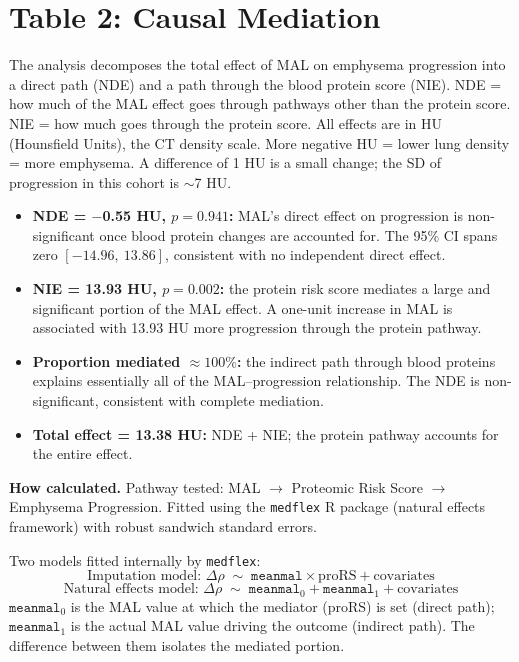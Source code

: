 \documentclass[11pt, letterpaper]{article}
\begin{document}
\section*{Table 2: Causal Mediation}

The analysis decomposes the total effect of MAL on emphysema progression
into a direct path (NDE) and a path through the blood protein score
(NIE). NDE = how much of the MAL effect goes through pathways other than
the protein score. NIE = how much goes through the protein score.
All effects are in HU (Hounsfield Units), the CT density scale. More
negative HU = lower lung density = more emphysema. A difference of 1 HU
is a small change; the SD of progression in this cohort is $\sim$7 HU.

\begin{itemize}
  \item \textbf{NDE = $-$0.55 HU, $p = 0.941$:} MAL's direct effect
    on progression is non-significant once blood protein changes are
    accounted for. The 95\% CI spans zero $[-14.96,\ 13.86]$,
    consistent with no independent direct effect.
  \item \textbf{NIE = 13.93 HU, $p = 0.002$:} the protein risk score
    mediates a large and significant portion of the MAL effect. A
    one-unit increase in MAL is associated with 13.93 HU more
    progression through the protein pathway.
  \item \textbf{Proportion mediated $\approx 100\%$:} the indirect
    path through blood proteins explains essentially all of the
    MAL--progression relationship. The NDE is non-significant,
    consistent with complete mediation.
  \item \textbf{Total effect = 13.38 HU:} NDE + NIE; the protein
    pathway accounts for the entire effect.
\end{itemize}

\textbf{How calculated.}
Pathway tested: MAL $\to$ Proteomic Risk Score $\to$ Emphysema
Progression. Fitted using the \texttt{medflex} R package (natural
effects framework) with robust sandwich standard errors.

Two models fitted internally by \texttt{medflex}:
\[
  \text{Imputation model: }
  \Delta\rho \;\sim\; \texttt{meanmal} \times \text{proRS} + \text{covariates}
\]
\[
  \text{Natural effects model: }
  \Delta\rho \;\sim\; \texttt{meanmal}_0 + \texttt{meanmal}_1 + \text{covariates}
\]
$\texttt{meanmal}_0$ is the MAL value at which the mediator (proRS) is
set (direct path); $\texttt{meanmal}_1$ is the actual MAL value driving
the outcome (indirect path). The difference between them isolates the
mediated portion.
\end{document}
